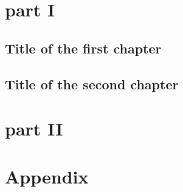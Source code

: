 \documentclass[a5paper, twocolumn]{scrbook}
\begin{document}
\frontmatter
  \doparttoc
  \tableofcontents
  \setcounter{part}{38}
  \part*{part I}
  \addtocounter{part}{1}
  \parttoc
\mainmatter
  \chapter{Title of the first chapter}
    \lipsum[1]
  \chapter{Title of the second chapter}
    \lipsum[1]

\part[MAI: Matematická analýza]{part II}
\backmatter 
\appendix%
        \part{Appendix}
\end{document}
